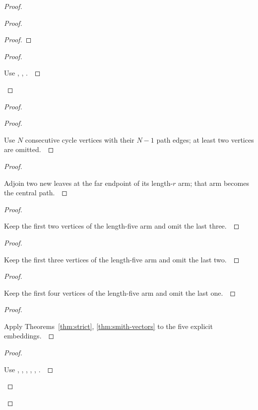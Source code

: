 \documentclass[11pt]{amsart}
\let\qed\relax
\theoremstyle{definition}
\begin{document}
\begin{proof}
\begin{proof}
\begin{proof}
\end{proof}
\qedstep
\begin{proof}
\pf\ \raggedright Use , , .~\qed
\end{proof}
\end{proof}
\begin{proof}
\begin{proof}
\pf\ \raggedright Use $N$ consecutive cycle vertices with their $N-1$ path edges; at least two vertices are omitted.~\qed
\end{proof}
\begin{proof}
\pf\ \raggedright Adjoin two new leaves at the far endpoint of its length-$r$ arm; that arm becomes the central path.~\qed
\end{proof}
\begin{proof}
\pf\ \raggedright Keep the first two vertices of the length-five arm and omit the last three.~\qed
\end{proof}
\begin{proof}
\pf\ \raggedright Keep the first three vertices of the length-five arm and omit the last two.~\qed
\end{proof}
\begin{proof}
\pf\ \raggedright Keep the first four vertices of the length-five arm and omit the last one.~\qed
\end{proof}
\begin{proof}
\pf\ \raggedright Apply Theorems~\ref{thm:strict}, \ref{thm:smith-vectors} to the five explicit embeddings.~\qed
\end{proof}
\qedstep
\begin{proof}
\pf\ \raggedright Use , , , , , .~\qed
\end{proof}
\end{proof}

\end{proof}
\end{document}
